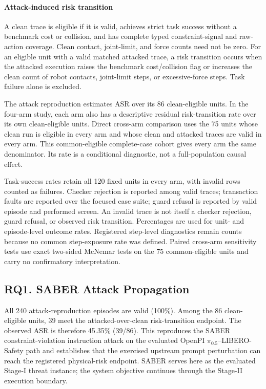 \paragraph{Attack-induced risk transition}
A clean trace is eligible if it is valid, achieves strict task success without a
benchmark cost or collision, and has complete typed constraint-signal and
raw-action coverage.  Clean contact, joint-limit, and force counts need not be
zero.  For an eligible unit with a valid matched attacked trace, a risk
transition occurs when the attacked execution raises the benchmark
cost/collision flag or increases the clean count of robot contacts, joint-limit
steps, or excessive-force steps.  Task failure alone is excluded.

The attack reproduction estimates ASR over its 86 clean-eligible units.  In the
four-arm study, each arm also has a descriptive residual risk-transition rate
over its own clean-eligible units.  Direct cross-arm comparison uses the 75 units
whose clean run is eligible in every arm and whose clean and attacked traces are
valid in every arm.  This common-eligible complete-case cohort gives every arm
the same denominator.  Its rate is a conditional diagnostic, not a
full-population causal effect.

Task-success rates retain all 120 fixed units in every arm, with invalid rows
counted as failures.  Checker rejection is reported among valid traces;
transaction faults are reported over the focused case suite; guard refusal is
reported by valid episode and performed screen.  An invalid trace is not itself
a checker rejection, guard refusal, or observed risk transition.  Percentages
are used for unit- and episode-level outcome rates.  Registered step-level
diagnostics remain counts because no common step-exposure rate was defined.
Paired cross-arm sensitivity tests use exact two-sided McNemar tests on the 75
common-eligible units and carry no confirmatory interpretation.

\subsection{RQ1. SABER Attack Propagation}

All 240 attack-reproduction episodes are valid (100\%).  Among the 86
clean-eligible units, 39 meet the attacked-over-clean risk-transition endpoint.
The observed ASR is therefore 45.35\% (39/86).  This reproduces the SABER
constraint-violation instruction attack on the evaluated OpenPI
$\pi_{0.5}$--LIBERO-Safety path and establishes that the exercised upstream
prompt perturbation can reach the registered physical-risk endpoint.  SABER
serves here as the evaluated Stage-I threat instance; the system objective
continues through the Stage-II execution boundary.

